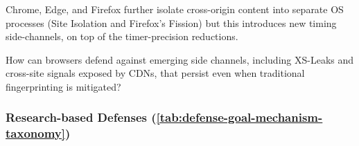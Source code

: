 %
Chrome, Edge, and Firefox further isolate cross-origin content into separate OS processes (Site Isolation and Firefox's Fission) but this introduces new timing side-channels, on top of the timer-precision reductions.


\begin{opbox}
How can browsers defend against emerging side channels, including XS-Leaks and cross-site signals exposed by CDNs, that persist even when traditional fingerprinting is mitigated?
\end{opbox}




\subsubsection{Research-based Defenses (\autoref{tab:defense-goal-mechanism-taxonomy})}
\label{sec:stateless-defenses-research}



